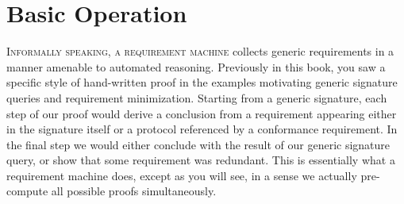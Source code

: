 \documentclass[../generics]{subfiles}
\begin{document}
\chapter{Basic Operation}\label{rqm basic operation}

\lettrine{I}{nformally speaking, a requirement machine} collects generic requirements in a manner amenable to automated reasoning. Previously in this book, you saw a specific style of hand-written proof in the examples motivating generic signature queries and requirement minimization. Starting from a generic signature, each step of our proof would derive a conclusion from a requirement appearing either in the signature itself or a protocol referenced by a conformance requirement. In the final step we would either conclude with the result of our generic signature query, or show that some requirement was redundant. This is essentially what a requirement machine does, except as you will see, in a sense we actually pre-compute all possible proofs simultaneously.
\end{document}

